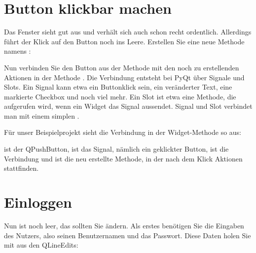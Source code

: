 






\section{Button klickbar machen}

Das Fenster sieht gut aus und verhält sich auch schon recht ordentlich. Allerdings führt der Klick auf den Button noch ins Leere. Erstellen Sie eine neue Methode namens :

\medskip
    

\medskip

Nun verbinden Sie den Button aus der Methode  mit den noch zu erstellenden Aktionen in der Methode . Die Verbindung entsteht bei PyQt über Signale und Slots. Ein Signal kann etwa ein Buttonklick sein, ein veränderter Text, eine markierte Checkbox und noch viel mehr. Ein Slot ist etwa eine Methode, die aufgerufen wird, wenn ein Widget das Signal aussendet. Signal und Slot verbindet man mit einem simplen .
    
Für unser Beispielprojekt sieht die Verbindung in der Widget-Methode so aus:
    
\medskip
    

\medskip
 
 ist der QPushButton,  ist das Signal, nämlich ein geklickter Button,  ist die Verbindung und  ist die neu erstellte Methode, in der nach dem Klick Aktionen stattfinden.
    
\section{Einloggen}

Nun ist  noch leer, das sollten Sie ändern. Als erstes benötigen Sie die Eingaben des Nutzers, also seinen Benutzernamen und das Passwort. Diese Daten holen Sie mit  aus den QLineEdits:

